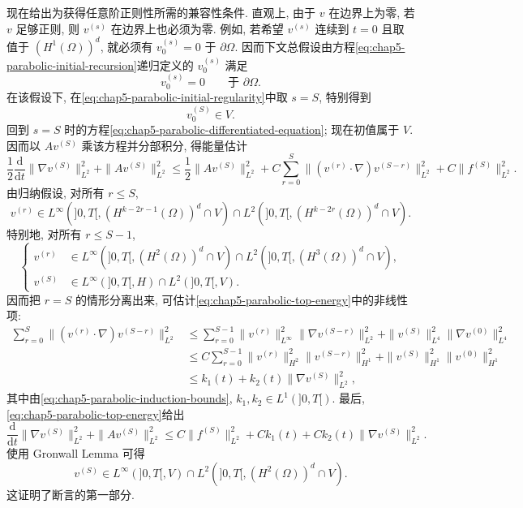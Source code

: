 \begin{Proof}
\begin{itemize}
 现在给出为获得任意阶正则性所需的兼容性条件. 直观上, 由于 $v$ 在边界上为零, 若 $v$ 足够正则, 则 $v^{(s)}$ 在边界上也必须为零. 例如, 若希望 $v^{(s)}$ 连续到 $t=0$ 且取值于 $(H^1(\Omega))^d$, 就必须有 $v_0^{(s)}=0$ 于 $\partial\Omega$. 因而下文总假设由方程\eqref{eq:chap5-parabolic-initial-recursion}递归定义的 $v_0^{(s)}$ 满足
 \begin{equation}
 v_0^{(s)}=0\qquad\text{于 }\partial\Omega.
 \label{eq:chap5-parabolic-compatibility}
 \end{equation}
 在该假设下, 在\eqref{eq:chap5-parabolic-initial-regularity}中取 $s=S$, 特别得到
 \[
 v_0^{(S)}\in V.
 \]
 回到 $s=S$ 时的方程\eqref{eq:chap5-parabolic-differentiated-equation}; 现在初值属于 $V$. 因而以 $Av^{(S)}$ 乘该方程并分部积分, 得能量估计
 \begin{equation}
 \frac12\frac{\mathrm d}{\mathrm dt}\|\nabla v^{(S)}\|_{L^2}^2
 +\|Av^{(S)}\|_{L^2}^2
 \leq\frac12\|Av^{(S)}\|_{L^2}^2
 +C\sum_{r=0}^S\|(v^{(r)}\cdot\nabla)v^{(S-r)}\|_{L^2}^2
 +C\|f^{(S)}\|_{L^2}^2.
 \label{eq:chap5-parabolic-top-energy}
 \end{equation}
 由归纳假设, 对所有 $r\leq S$,
 \[
 v^{(r)}\in L^\infty(]0,T[,(H^{k-2r-1}(\Omega))^d\cap V)
 \cap L^2(]0,T[,(H^{k-2r}(\Omega))^d\cap V).
 \]
 特别地, 对所有 $r\leq S-1$,
 \begin{equation}
 \left\{
 \begin{aligned}
 v^{(r)}&\in L^\infty(]0,T[,(H^2(\Omega))^d\cap V)
 \cap L^2(]0,T[,(H^3(\Omega))^d\cap V),\\
 v^{(S)}&\in L^\infty(]0,T[,H)\cap L^2(]0,T[,V).
 \end{aligned}
 \right.
 \label{eq:chap5-parabolic-induction-bounds}
 \end{equation}
 因而把 $r=S$ 的情形分离出来, 可估计\eqref{eq:chap5-parabolic-top-energy}中的非线性项:
 \begin{align*}
 \sum_{r=0}^S\|(v^{(r)}\cdot\nabla)v^{(S-r)}\|_{L^2}^2
 &\leq\sum_{r=0}^{S-1}\|v^{(r)}\|_{L^\infty}^2
 \|\nabla v^{(S-r)}\|_{L^2}^2
 +\|v^{(S)}\|_{L^4}^2\|\nabla v^{(0)}\|_{L^4}^2\\
 &\leq C\sum_{r=0}^{S-1}\|v^{(r)}\|_{H^2}^2
 \|v^{(S-r)}\|_{H^1}^2
 +\|v^{(S)}\|_{H^1}^2\|v^{(0)}\|_{H^1}^2\\
 &\leq k_1(t)+k_2(t)\|\nabla v^{(S)}\|_{L^2}^2,
 \end{align*}
 其中由\eqref{eq:chap5-parabolic-induction-bounds}, $k_1,k_2\in L^1(]0,T[)$. 最后, \eqref{eq:chap5-parabolic-top-energy}给出
 \[
 \frac{\mathrm d}{\mathrm dt}\|\nabla v^{(S)}\|_{L^2}^2
 +\|Av^{(S)}\|_{L^2}^2
 \leq C\|f^{(S)}\|_{L^2}^2+Ck_1(t)
 +Ck_2(t)\|\nabla v^{(S)}\|_{L^2}^2.
 \]
 使用 Gronwall Lemma 可得
 \[
 v^{(S)}\in L^\infty(]0,T[,V)\cap L^2(]0,T[,(H^2(\Omega))^d\cap V).
 \]
 这证明了断言的第一部分.


\end{itemize}
\end{Proof}
